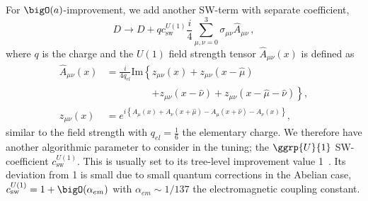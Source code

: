 For $\bigO(a)$-improvement, we add another SW-term with separate coefficient,
\begin{equation} \label{eq:Dw2}
D \rightarrow D + q c_\mathrm{sw}^{U(1)} \frac{i}{4} \sum_{\mu,\nu=0}^3 \sigma_{\mu \nu} \hat{A}_{\mu \nu}\,,
\end{equation}
where $q$ is the charge and the $U(1)$ field strength tensor $\hat{A}_{\mu \nu}(x)$ is defined as
\begin{align*}
\hat{A}_{\mu \nu}(x) &= \frac{i}{4 q_{el}} \text{Im} \left\{
      z_{\mu \nu}(x)
    + z_{\mu \nu}(x-\hat{\mu})
    \right. \\
    &\phantom{=\frac{i}{4 q_{\text{el}}} \text{Im} \left\{ \right.} \left. 
    + z_{\mu \nu}(x-\hat{\nu})
    + z_{\mu \nu}(x-\hat{\mu}-\hat{\nu})
\right\}, \\
z_{\mu \nu}(x) &= e^{i\left\{
      A_{\mu}(x)
    + A_{\nu}(x+\hat{\mu})
    - A_{\mu}(x+\hat{\nu})
    - A_{\nu}(x)
\right\}},
\end{align*}
similar to the  field strength with $q_{el} = \frac{1}{6}$ the elementary charge.
We therefore have another algorithmic parameter to consider in the tuning; the $\ggrp{U}{1}$ SW-coefficient $c_\mathrm{sw}^{U(1)}$.
This is usually set to its tree-level improvement value \num{1}~\cite{RCstar22}.
Its deviation from \num{1} is small due to small quantum corrections in the Abelian case, $c_\mathrm{sw}^{U(1)} = 1 + \bigO(\alpha_{em})$ with $\alpha_{em} \sim 1/137$ the electromagnetic coupling constant.

